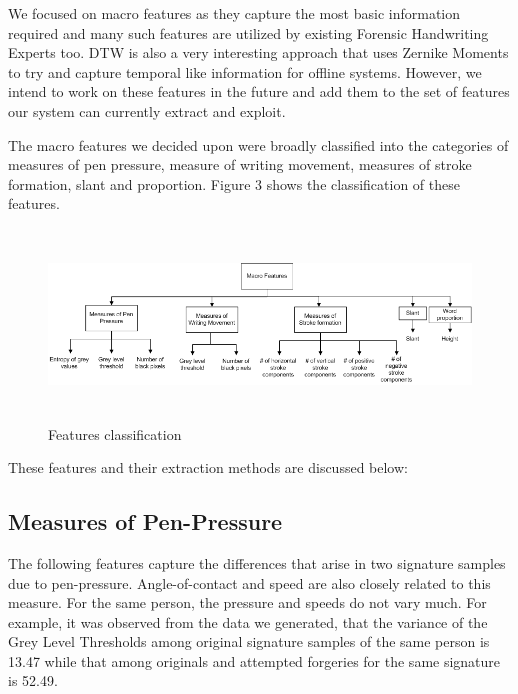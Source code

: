 \documentclass{article}
\begin{document}
We focused on macro features as they capture the most basic information required and many such features are utilized by existing Forensic Handwriting Experts too. DTW is also a very interesting approach that uses Zernike Moments to try and capture temporal like information for offline systems. However, we intend to work on these features in the future and add them to the set of features our system can currently extract and exploit.

The macro features we decided upon were broadly classified into the categories of measures of pen pressure, measure of writing movement, measures of stroke formation, slant and proportion. Figure 3 shows the classification of these features.

\begin{figure}[h]
\begin{center}
\includegraphics[width=5.75in,height=2in]{Features.png}
\end{center}
\caption{Features classification}
\end{figure}


These features and their extraction methods are discussed below:

\subsection{Measures of Pen-Pressure}

The following features capture the differences that arise in two signature samples due to pen-pressure. Angle-of-contact and speed are also closely related to this measure. For the same person, the pressure and speeds do not vary much. For example, it was observed from the data we generated, that the variance of the Grey Level Thresholds among original signature samples of the same person is 13.47 while that among originals and attempted forgeries for the same signature is 52.49.
\end{document}
